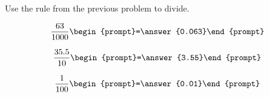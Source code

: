 \documentclass{ximera}
\begin{document}
\begin{center}
\end{center}


\begin{problem}  Use the rule from the previous problem to divide.


\[ \frac{63}{1000} \begin{prompt}=\answer{0.063}\end{prompt} \]

\[ \frac{35.5}{10} \begin{prompt}=\answer{3.55}\end{prompt} \]

\[ \frac{1}{100} \begin{prompt}=\answer{0.01}\end{prompt} \]

\end{problem}
\end{document}
